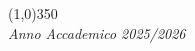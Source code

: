 \documentclass[12pt, a4paper, oneside]{report}
\begin{document}
\begin{titlepage}
\begin{center}
        \vfill %
        \begin{center}
            \line(1,0){350}\\
            \normalsize{\textit{Anno Accademico 2025/2026}}
        \end{center}
    \end{center}
\end{titlepage}
\end{document}
